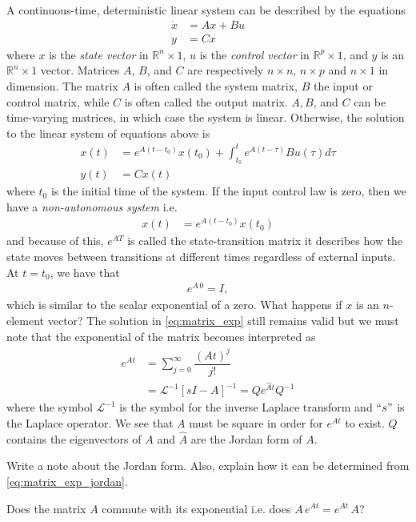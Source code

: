 A continuous-time, deterministic linear system can be described by the equations 
%
\begin{align}
	\dot{x} &= Ax + Bu \nonumber \\
	y &= Cx
\end{align}
%
where $x$ is the \textit{state vector} in $\mathbb{R}^n \times 1$, $u$ is the \textit{control vector} in $\mathbb{R}^p \times 1$, and $y$ is an  $\mathbb{R}^n \times 1$ vector. Matrices $A$, $B$, and $C$ are respectively $n\times n$, $n \times p$ and $n \times 1$ in dimension. The matrix $A$ is often called the system matrix, $B$ the input or control matrix, while $C$ is often called the output matrix. $A, B$, and $C$ can be time-varying matrices, in which case the system is linear. Otherwise, the solution to the linear system of equations above is 
%
\begin{align}
	x(t) &= e^{A(t-t_0)} x(t_0) + \int_{t_0}^{t} e^{A(t-\tau)} B u(\tau) d\tau  \\
	y(t) &= C x(t)
	\label{eq:matrix_exp}
\end{align}
%
where $t_0$ is the initial time of the system. If the input control law is zero, then we have a \textit{non-autonomous system} i.e.
%
\begin{align}
	x(t) &= e^{A(t-t_0)} x(t_0) 
\end{align}
%
and because of this, $e^{AT}$ is called the state-transition matrix \ie it describes how the state moves between transitions at different times regardless of external inputs. At $t = t_0$, we have that 
%
\begin{align}
	e^{A \, 0} = I,
\end{align}
%
which is similar to the scalar exponential of a zero. What happens if $x$ is an $n$-element vector? The solution in \eqref{eq:matrix_exp} still remains valid but we must note that the exponential of the matrix becomes interpreted as 
%
\begin{align}
	e^{At} &= \sum_{j=0}^{\infty} \dfrac{(At)^j}{j!} \nonumber \\
	&= \mathcal{L}^{-1} \left[sI - A\right]^{-1} = Q e^{\hat{A}t} Q^{-1}
	\label{eq:matrix_exp_jordan}
\end{align}
%
where the symbol $\mathcal{L}^{-1}$ is the symbol for the inverse Laplace transform and $``s"$ is the Laplace operator. We see that $A$ must be square in order for $e^{At}$ to exist. $Q$ contains the eigenvectors of $A$ and $\hat{A}$ are the Jordan form of $A$.
%
\begin{quiz}
	Write a note about the Jordan form. Also, explain how it can be determined from \eqref{eq:matrix_exp_jordan}.
\end{quiz}
%
\begin{quiz}
	Does the matrix $A$ commute with its exponential i.e. does $A \, e^{At} = e^{At} \, A$? 
\end{quiz}

